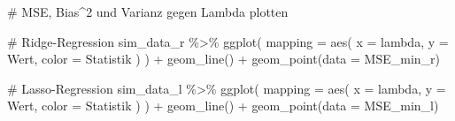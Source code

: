 \documentclass[
  a4paper,
  DIV=11,
  oneside]{scrreprt}
\newenvironment{Shaded}{\begin{snugshade}}{\end{snugshade}}
\newcommand{\AttributeTok}[1]{\textcolor[rgb]{0.40,0.45,0.13}{#1}}
\newcommand{\CommentTok}[1]{\textcolor[rgb]{0.37,0.37,0.37}{#1}}
\newcommand{\FunctionTok}[1]{\textcolor[rgb]{0.28,0.35,0.67}{#1}}
\newcommand{\NormalTok}[1]{\textcolor[rgb]{0.00,0.23,0.31}{#1}}
\newcommand{\SpecialCharTok}[1]{\textcolor[rgb]{0.37,0.37,0.37}{#1}}
\begin{document}
\begin{Shaded}
\begin{Highlighting}[]
\CommentTok{\# MSE, Bias\^{}2 und Varianz gegen Lambda plotten}

\CommentTok{\# Ridge{-}Regression}
\NormalTok{sim\_data\_r }\SpecialCharTok{\%\textgreater{}\%}
  \FunctionTok{ggplot}\NormalTok{(}
    \AttributeTok{mapping =} \FunctionTok{aes}\NormalTok{(}
      \AttributeTok{x =}\NormalTok{ lambda, }
      \AttributeTok{y =}\NormalTok{ Wert, }
      \AttributeTok{color =}\NormalTok{ Statistik}
\NormalTok{    )}
\NormalTok{  ) }\SpecialCharTok{+}
  \FunctionTok{geom\_line}\NormalTok{() }\SpecialCharTok{+}
  \FunctionTok{geom\_point}\NormalTok{(}\AttributeTok{data =}\NormalTok{ MSE\_min\_r)}

\CommentTok{\# Lasso{-}Regression}
\NormalTok{sim\_data\_l }\SpecialCharTok{\%\textgreater{}\%}
  \FunctionTok{ggplot}\NormalTok{(}
    \AttributeTok{mapping =} \FunctionTok{aes}\NormalTok{(}
      \AttributeTok{x =}\NormalTok{ lambda, }
      \AttributeTok{y =}\NormalTok{ Wert, }
      \AttributeTok{color =}\NormalTok{ Statistik}
\NormalTok{    )}
\NormalTok{  ) }\SpecialCharTok{+}
  \FunctionTok{geom\_line}\NormalTok{() }\SpecialCharTok{+}
  \FunctionTok{geom\_point}\NormalTok{(}\AttributeTok{data =}\NormalTok{ MSE\_min\_l)}
\end{Highlighting}
\end{Shaded}
\end{document}
